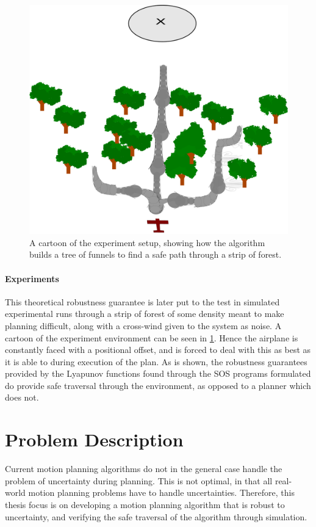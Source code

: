 \begin{figure}
  \centering
  \includegraphics[width=.8\textwidth]{figures/experiments/experiment-airplane-strip}
  \caption[The experiment setup visualized]{A cartoon of the experiment setup, showing how the \rrtfunnel{}
    algorithm builds a tree of funnels to find a safe path through a strip of
    forest.}
  \label{fig:experiments-cartoon}
\end{figure}

\paragraph{Experiments}
This theoretical robustness guarantee is later put to the test in simulated
experimental runs through a strip of forest of some density meant to make
planning difficult, along with a cross-wind given to the system as noise. A
cartoon of the experiment environment can be seen in
\cref{fig:experiments-cartoon}. Hence the airplane is constantly faced with a
positional offset, and is forced to deal with this as best as it is able to
during execution of the plan. As is shown, the robustness guarantees provided by
the Lyapunov functions found through the \ac{SOS} programs formulated do provide
safe traversal through the environment, as opposed to a planner which does not.

\section{Problem Description}

Current motion planning algorithms do not in the general case handle the problem
of uncertainty during planning. This is not optimal, in that all real-world
motion planning problems have to handle uncertainties. Therefore, this thesis
focus is on developing a motion planning algorithm that is robust to
uncertainty, and verifying the safe traversal of the algorithm through
simulation.

